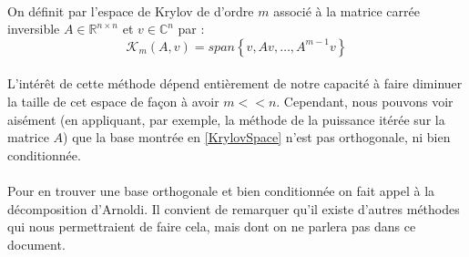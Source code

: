         \paragraph{}
        On définit par l'espace de Krylov de d'ordre $m$ associé à la matrice carrée inversible $A \in \mathbb{R}^{n \times n}$ et $v \in \mathbb{C}^{n}$ par :
        \begin{equation} 
            \mathcal{K}_{m}(A, v)=s p a n \left\{v, A v, \ldots, A^{m-1} v\right\}
            \label{KrylovSpace}
        \end{equation}

        \paragraph{}
        L'intérêt de cette méthode dépend entièrement de notre capacité à faire diminuer la taille de cet espace de façon à avoir $m<<n$. Cependant, nous pouvons voir aisément (en appliquant, par exemple, la méthode de la puissance itérée sur la matrice $A$) que la base montrée en \ref{KrylovSpace} n'est pas orthogonale, ni bien conditionnée.

        \paragraph{}
        Pour en trouver une base orthogonale et bien conditionnée on fait appel à la décomposition d'Arnoldi. Il convient de remarquer qu'il existe d'autres méthodes qui nous permettraient de faire cela, mais dont on ne parlera pas dans ce document.

        \vspace{0.3cm}


